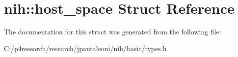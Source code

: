 \hypertarget{structnih_1_1host__space}{
\section{nih\-:\-:host\-\_\-space \-Struct \-Reference}
\label{structnih_1_1host__space}
}


\-The documentation for this struct was generated from the following file\-:\begin{DoxyCompactItemize}
\item 
\-C\-:/p4research/research/jpantaleoni/nih/basic/types.\-h\end{DoxyCompactItemize}
